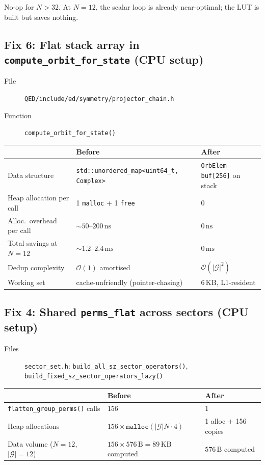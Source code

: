 \documentclass[11pt,a4paper]{article}
\begin{document}
No-op for $N > 32$.  At $N=12$, the scalar loop is already near-optimal;
the LUT is built but saves nothing.

\subsection{Fix 6: Flat stack array in \texttt{compute\_orbit\_for\_state} (CPU setup)}

\begin{description}
  \item[File] \texttt{QED/include/ed/symmetry/projector\_chain.h}
  \item[Function] \texttt{compute\_orbit\_for\_state()}
\end{description}

\begin{center}
\begin{tabular}{@{}lll@{}}
\toprule
 & Before & After \\
\midrule
Data structure & \texttt{std::unordered\_map<uint64\_t, Complex>} & \texttt{OrbElem buf[256]} on stack \\
Heap allocation per call & 1 \texttt{malloc} + 1 \texttt{free} & 0 \\
Alloc.\ overhead per call & $\sim 50$--$200\,\mathrm{ns}$ & $0\,\mathrm{ns}$ \\
Total savings at $N=12$ & $\sim 1.2$--$2.4\,\mathrm{ms}$ & $0\,\mathrm{ms}$ \\
Dedup complexity & $\mathcal{O}(1)$ amortised & $\mathcal{O}(|\mathcal{G}|^2)$ \\
Working set & cache-unfriendly (pointer-chasing) & $6\,\mathrm{KB}$, L1-resident \\
\bottomrule
\end{tabular}
\end{center}

\subsection{Fix 4: Shared \texttt{perms\_flat} across sectors (CPU setup)}

\begin{description}
  \item[Files] \texttt{sector\_set.h}: \texttt{build\_all\_sz\_sector\_operators()},
    \texttt{build\_fixed\_sz\_sector\_operators\_lazy()}
\end{description}

\begin{center}
\begin{tabular}{@{}lll@{}}
\toprule
 & Before & After \\
\midrule
\texttt{flatten\_group\_perms()} calls & 156 & 1 \\
Heap allocations & $156 \times \texttt{malloc}(|\mathcal{G}| N \cdot 4)$ & 1 alloc $+$ 156 copies \\
Data volume ($N=12$, $|\mathcal{G}|=12$) & $156 \times 576\,\mathrm{B} = 89\,\mathrm{KB}$ computed & $576\,\mathrm{B}$ computed \\
\bottomrule
\end{tabular}
\end{center}
\end{document}
